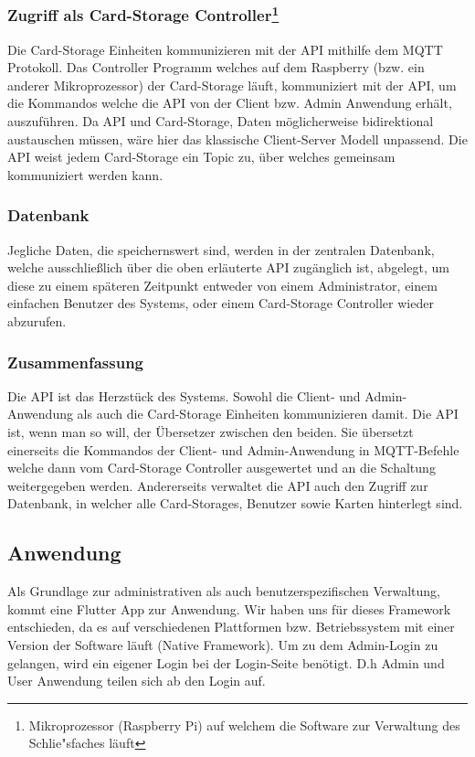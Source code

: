 \subsubsection[Zugriff als Card-Storage Controller]{Zugriff als Card-Storage Controller\protect\footnote{Mikroprozessor (Raspberry Pi) auf welchem die Software zur Verwaltung des Schlie"sfaches läuft}}
Die Card-Storage Einheiten kommunizieren mit der API mithilfe dem MQTT Protokoll. Das Controller Programm welches auf dem Raspberry (bzw. ein anderer Mikroprozessor) der Card-Storage läuft,
kommuniziert mit der API, um die Kommandos welche die API von der Client bzw. Admin Anwendung erhält, auszuführen. Da API und Card-Storage, Daten möglicherweise bidirektional austauschen müssen, wäre hier das klassische Client-Server Modell unpassend. Die API weist jedem Card-Storage ein Topic zu, über welches gemeinsam kommuniziert werden kann. 

\subsubsection{Datenbank}
Jegliche Daten, die speichernswert sind, werden in der zentralen Datenbank, welche ausschließlich über die oben erläuterte API zugänglich ist, abgelegt, um diese zu einem späteren Zeitpunkt entweder von einem Administrator, einem einfachen Benutzer des Systems, oder einem Card-Storage Controller wieder abzurufen.   

\subsubsection{Zusammenfassung}
Die API ist das Herzstück des Systems. Sowohl die Client- und Admin-Anwendung als auch die Card-Storage Einheiten kommunizieren damit. Die API ist, wenn man so will, der Übersetzer zwischen den beiden. Sie übersetzt einerseits die Kommandos der Client- und Admin-Anwendung in MQTT-Befehle welche dann vom Card-Storage Controller ausgewertet und an die Schaltung weitergegeben werden. Andererseits verwaltet die API auch den Zugriff zur Datenbank, in welcher alle Card-Storages, Benutzer sowie Karten hinterlegt sind. 

\subsection{Anwendung}
Als Grundlage zur administrativen als auch benutzerspezifischen Verwaltung, kommt eine Flutter App zur Anwendung. Wir haben uns für dieses Framework entschieden, da es auf verschiedenen Plattformen bzw. Betriebssystem mit einer Version der Software läuft (Native Framework). Um zu dem Admin-Login zu gelangen, wird ein eigener Login bei der Login-Seite benötigt. D.h Admin und User Anwendung teilen sich ab den Login auf.

